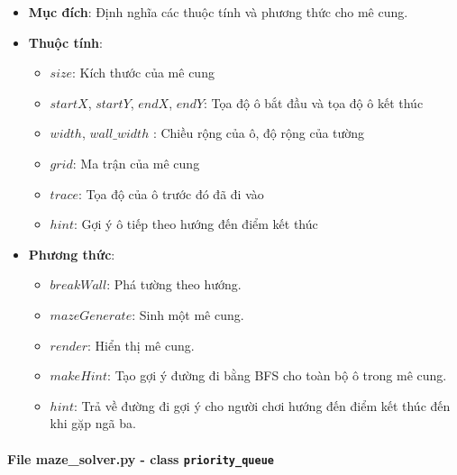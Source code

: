 \begin{itemize}
    \item \textbf{Mục đích}: Định nghĩa các thuộc tính và phương thức cho mê cung.
    
    \item \textbf{Thuộc tính}:
        \begin{itemize}
            \item $size$: Kích thước của mê cung
            \item $startX$, $startY$, $endX$, $endY$: Tọa độ ô bắt đầu và tọa độ ô kết thúc
            \item $width$, $wall\_width$ : Chiều rộng của ô, độ rộng của tường
            \item $grid$: Ma trận của mê cung
            \item $trace$: Tọa độ của ô trước đó đã đi vào
            \item $hint$: Gợi ý ô tiếp theo hướng đến điểm kết thúc
        \end{itemize}
        
    \item \textbf{Phương thức}:
        \begin{itemize}
            \item $breakWall$: Phá tường theo hướng.
            \item $mazeGenerate$: Sinh một mê cung. 
            \item $render$: Hiển thị mê cung.
            \item $makeHint$: Tạo gợi ý đường đi bằng BFS cho toàn bộ ô trong mê cung.
            \item $hint$: Trả về đường đi gợi ý cho người chơi hướng đến điểm kết thúc đến khi gặp ngã ba.
        \end{itemize}
\end{itemize}

\paragraph{File maze\_solver.py - class \texttt{priority\_queue}}

